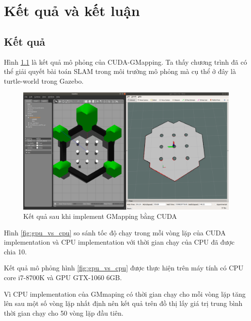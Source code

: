 \documentclass[../../main.tex]{subfiles}
\begin{document}
\graphicspath{{img/}{06_result/img/}}

\chapter{Kết quả và kết luận}

\section{Kết quả}
Hình \ref{fig:cuda_implement_result} là kết quả mô phỏng của CUDA-GMapping. Ta thấy chương trình đã có thể giải quyết bài toán SLAM trong môi trường mô phỏng mà cụ thể ở đây là turtle-world trong Gazebo.
\begin{figure}[H]
    \begin{center}
        \includegraphics[scale=0.25]{turtle_world.png}
    \end{center}
    \caption{Kết quả sau khi implement GMapping bằng CUDA}
    \label{fig:cuda_implement_result}
\end{figure}

Hình \ref{fig:gpu_vs_cpu} so sánh tốc độ chạy trong mỗi vòng lặp của CUDA implementation và CPU implementation với thời gian chạy của CPU đã được chia 10.

Kết quả mô phỏng hình \ref{fig:gpu_vs_cpu} được thực hiện trên máy tính có CPU core i7-8700K và GPU GTX-1060 6GB.

Vì CPU implementation của GMmaping có thời gian chạy cho mỗi vòng lặp tăng lên sau một số vòng lặp nhất định nên kết quả trên đồ thị lấy giá trị trung bình thời gian chạy cho 50 vòng lặp đầu tiên.
\end{document}
